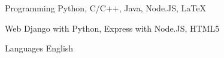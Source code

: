 


\begin{cvskills}


\cvskill
{Programming} %
{Python, C/C++, Java, Node.JS, LaTeX} %


\cvskill
{Web} %
{Django with Python, Express with Node.JS, HTML5} %


\cvskill
{Languages} %
{English} %


\end{cvskills}
